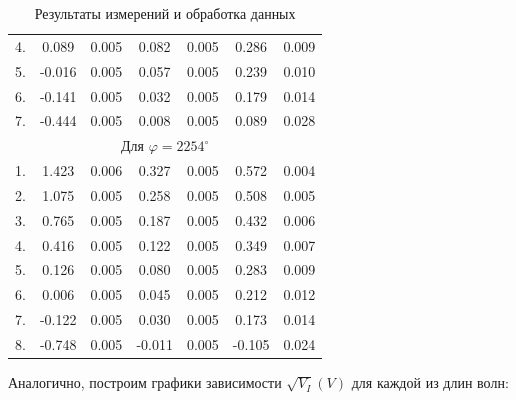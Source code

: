 \documentclass[a4paper,12pt]{extarticle}
\begin{document}
\begin{table}[H]
\begin{center}
\begin{tabular}{|c|c|c|c|c|c|c|}
			4. & 0.089 & 0.005 & 0.082 & 0.005 & 0.286 & 0.009 \\
			5. & -0.016 & 0.005 & 0.057 & 0.005 & 0.239 & 0.010 \\
			6. & -0.141 & 0.005 & 0.032 & 0.005 & 0.179 & 0.014 \\
			7. & -0.444 & 0.005 & 0.008 & 0.005 & 0.089 & 0.028 \\
			\hline 
			\multicolumn{7}{|c|}{Для $\varphi = 2254^\circ$} \\
			\hline
			1. & 1.423 & 0.006 & 0.327 & 0.005 & 0.572 & 0.004 \\
			2. & 1.075 & 0.005 & 0.258 & 0.005 & 0.508 & 0.005 \\
			3. & 0.765 & 0.005 & 0.187 & 0.005 & 0.432 & 0.006 \\
			4. & 0.416 & 0.005 & 0.122 & 0.005 & 0.349 & 0.007 \\
			5. & 0.126 & 0.005 & 0.080 & 0.005 & 0.283 & 0.009 \\
			6. & 0.006 & 0.005 & 0.045 & 0.005 & 0.212 & 0.012 \\
			7. & -0.122 & 0.005 & 0.030 & 0.005 & 0.173 & 0.014 \\
			8. & -0.748 & 0.005 & -0.011 & 0.005 & -0.105 & 0.024 \\
			\hline
		\end{tabular}
        \caption{Результаты измерений и обработка данных}
	\end{center}
\end{table}

\newpage
Аналогично, построим графики зависимости $\sqrt{V_I}(V)$ для каждой из длин волн:
\end{document}
